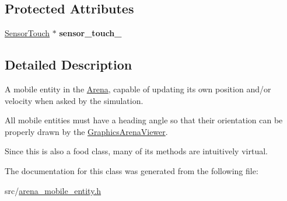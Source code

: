 \subsection*{Protected Attributes}
\begin{DoxyCompactItemize}
\item 
\mbox{\label{class_arena_mobile_entity_a260fd3fba196ee9ab56f9f2ce6ab4a21}} 
\mbox{\hyperlink{class_sensor_touch}{Sensor\+Touch}} $\ast$ {\bfseries sensor\+\_\+touch\+\_\+}
\end{DoxyCompactItemize}


\subsection{Detailed Description}
A mobile entity in the \mbox{\hyperlink{class_arena}{Arena}}, capable of updating its own position and/or velocity when asked by the simulation. 

All mobile entities must have a heading angle so that their orientation can be properly drawn by the \mbox{\hyperlink{class_graphics_arena_viewer}{Graphics\+Arena\+Viewer}}.

Since this is also a food class, many of its methods are intuitively {\ttfamily virtual}. 

The documentation for this class was generated from the following file\+:\begin{DoxyCompactItemize}
\item 
src/\mbox{\hyperlink{arena__mobile__entity_8h}{arena\+\_\+mobile\+\_\+entity.\+h}}\end{DoxyCompactItemize}
